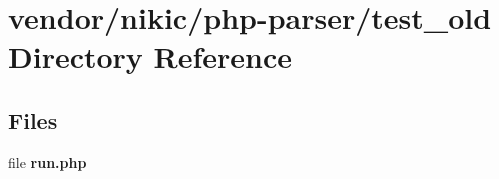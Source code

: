 \section{vendor/nikic/php-\/parser/test\+\_\+old Directory Reference}
\label{dir_0fa088564a46a80f08f032385de2471d}
\subsection*{Files}
\begin{DoxyCompactItemize}
\item 
file {\bf run.\+php}
\end{DoxyCompactItemize}

